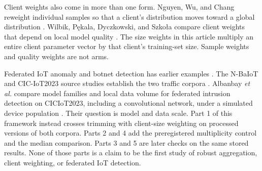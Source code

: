 \documentclass{ieeeaccess}
\begin{document}
Client weights also come in more than one form. Nguyen, Wu, and Chang reweight individual samples so that a client's distribution moves toward a global distribution \cite{nguyen24weights}. Wilbik, P\k{e}kala, Dyczkowski, and Szko{\l}a compare client weights that depend on local model quality \cite{wilbik23}. The size weights in this article multiply an entire client parameter vector by that client's training-set size. Sample weights and quality weights are not arms.

Federated IoT anomaly and botnet detection has earlier examples \cite{nguyen19diot,popoola22}. The N-BaIoT and CIC-IoT2023 source studies establish the two traffic corpora \cite{meidan18,neto23}. Albanbay \emph{et al.} compare model families and local data volume for federated intrusion detection on CICIoT2023, including a convolutional network, under a simulated device population \cite{albanbay25}. Their question is model and data scale. Part 1 of this framework instead crosses trimming with client-size weighting on processed versions of both corpora. Parts 2 and 4 add the preregistered multiplicity control and the median comparison. Parts 3 and 5 are later checks on the same stored results. None of those parts is a claim to be the first study of robust aggregation, client weighting, or federated IoT detection.
\end{document}
